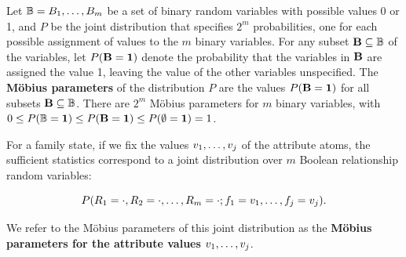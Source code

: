 \documentclass[oribibl]{llncs}
\begin{document}
%
%

Let $\mathbb{B} = B_{1},\ldots,B_{m}$ be a set of binary random variables with possible values 0 or 1, and $P$ be the joint distribution that specifies $2^{m}$ probabilities, one for each possible assignment of values to the $m$ binary variables. For any subset $\mathbf{B} \subseteq \mathbb{B}$ of the variables, let $P(\mathbf{B} = \mathbf{1})$ denote the probability that the variables in $\mathbf{B}$ are assigned the value 1, leaving the value of the other variables unspecified. The \textbf{M\"obius parameters} of the distribution $P$ are the values $P(\mathbf{B} = \mathbf{1})$ for all subsets $\mathbf{B} \subseteq \mathbb{B}$\cite[Sec.3]{Drton08}.
There are $2^{m}$ M\"obius parameters for $m$ binary variables, with $0\leq P(\mathbb{B}=\mathbf{1})\leq P(\mathbf{B}=\mathbf{1})\leq P(\emptyset=\mathbf{1}) = 1$.

For a family state, if we fix the values $v_{1},\ldots,v_{j}$ of the attribute atoms, the sufficient statistics correspond to a joint distribution over $m$ Boolean relationship random variables:

$$P(R_{1} = \cdot, R_{2} = \cdot,\ldots, R_{m} = \cdot; f_{1} = v_{1},\ldots,f_{j} = v_{j}).$$

\noindent We refer to the M\"obius parameters of this joint distribution as the \textbf{M\"obius parameters for the attribute values} $v_{1},\ldots,v_{j}$.
\end{document}
